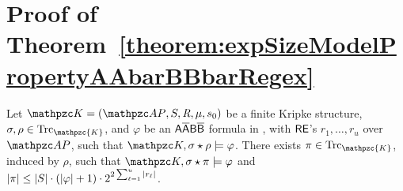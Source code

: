 \section{Proof of Theorem~\ref{theorem:expSizeModelPropertyAAbarBBbarRegex}}\label{proof:theorem:expSizeModelPropertyAAbarBBbarRegex}

\begin{theorem*}
Let $\Ku=(\Prop,\States,\allowbreak \Edges,\Lab,\sinit)$ be a finite Kripke structure, $\sigma,\rho \in \Trk_\mathpzc{K}$, and $\varphi$ be an $\mathsf{A\overline{A}B\overline{B}}$ formula in \nnf{}, with $\mathsf{RE}$'s  $r_1,\ldots ,r_u$ over $\Prop$, such that $\Ku,\sigma\star\rho\models \varphi$. There exists $\pi\in \Trk_\mathpzc{K}$, induced by $\rho$, such that $\Ku,\sigma\star\pi\models \varphi$ and $|\pi|\leq |S|\cdot (|\varphi|+1) \cdot 2^{2\sum_{\ell=1}^u |r_\ell|}$.
\end{theorem*}

